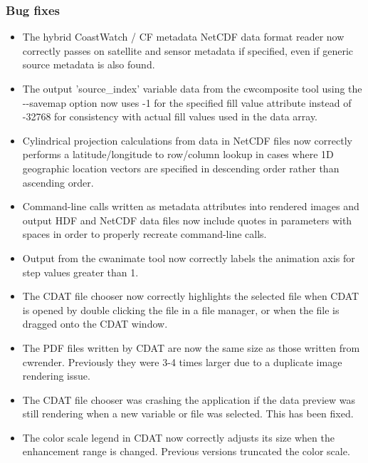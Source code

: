 \subsubsection*{ Bug fixes}
\begin{itemize}

\item The hybrid CoastWatch / CF metadata NetCDF data format reader now
correctly passes on satellite and sensor metadata if specified, even if 
generic source metadata is also found.

\item The output 'source\_index' variable data from the cwcomposite tool 
using the -{-}savemap option now uses -1 for the specified fill value 
attribute instead of -32768 for consistency with actual fill values used in
the data array.

\item Cylindrical projection calculations from data in NetCDF files now 
correctly performs a latitude/longitude to row/column lookup in cases
where 1D geographic location vectors are specified in descending order rather
than ascending order.

\item Command-line calls written as metadata attributes into rendered images 
and output HDF and NetCDF data files now include quotes in parameters with
spaces in order to properly recreate command-line calls.

\item Output from the cwanimate tool now correctly labels the animation 
axis for step values greater than 1.

\item The CDAT file chooser now correctly highlights the selected file when
CDAT is opened by double clicking the file in a file manager, or when the
file is dragged onto the CDAT window.

\item The PDF files written by CDAT are now the same size as those written
from cwrender.  Previously they were 3-4 times larger due to a duplicate
image rendering issue.

\item The CDAT file chooser was crashing the application if the data preview
was still rendering when a new variable or file was selected.  This has
been fixed.

\item The color scale legend in CDAT now correctly adjusts its size when
the enhancement range is changed.  Previous versions truncated the color
scale.


\end{itemize}
